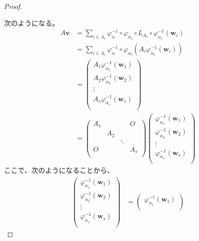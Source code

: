 \documentclass[dvipdfmx]{jsarticle}
\begin{document}
\begin{proof}
\begin{center}
\begin{tikzpicture}[auto]
\end{tikzpicture}
\end{center}
次のようになる。
\begin{align*}
A\mathbf{v} &= \sum_{i \in \varLambda_{s}} {\varphi_{\alpha}^{- 1} \circ \varphi_{\alpha_{i}} \circ L_{A_{i}} \circ \varphi_{\alpha_{i}}^{- 1}\left( \mathbf{w}_{i} \right)}\\
&= \sum_{i \in \varLambda_{s}} {\varphi_{\alpha}^{- 1} \circ \varphi_{\alpha_{i}}\left( A_{i}\varphi_{\alpha_{i}}^{- 1}\left( \mathbf{w}_{i} \right) \right)}\\
&= \begin{pmatrix}
A_{1}\varphi_{\alpha_{1}}^{- 1}\left( \mathbf{w}_{1} \right) \\
A_{2}\varphi_{\alpha_{2}}^{- 1}\left( \mathbf{w}_{2} \right) \\
 \vdots \\
A_{s}\varphi_{\alpha_{s}}^{- 1}\left( \mathbf{w}_{s} \right) \\
\end{pmatrix}\\
&= \begin{pmatrix}
A_{1} & \  & \  & O \\
\  & A_{2} & \  & \  \\
\  & \  & \ddots & \  \\
O & \  & \  & A_{s} \\
\end{pmatrix}\begin{pmatrix}
\varphi_{\alpha_{1}}^{- 1}\left( \mathbf{w}_{1} \right) \\
\varphi_{\alpha_{2}}^{- 1}\left( \mathbf{w}_{2} \right) \\
 \vdots \\
\varphi_{\alpha_{s}}^{- 1}\left( \mathbf{w}_{s} \right) \\
\end{pmatrix}
\end{align*}
ここで、次のようになることから、
\begin{align*}
\begin{pmatrix}
\varphi_{\alpha_{1}}^{- 1}\left( \mathbf{w}_{1} \right) \\
\varphi_{\alpha_{2}}^{- 1}\left( \mathbf{w}_{2} \right) \\
 \vdots \\
\varphi_{\alpha_{s}}^{- 1}\left( \mathbf{w}_{s} \right) \\
\end{pmatrix} &= \begin{pmatrix}
\varphi_{\alpha_{1}}^{- 1}\left( \mathbf{w}_{1} \right) \\

\end{pmatrix}
\end{align*}
\end{proof}
\end{document}
